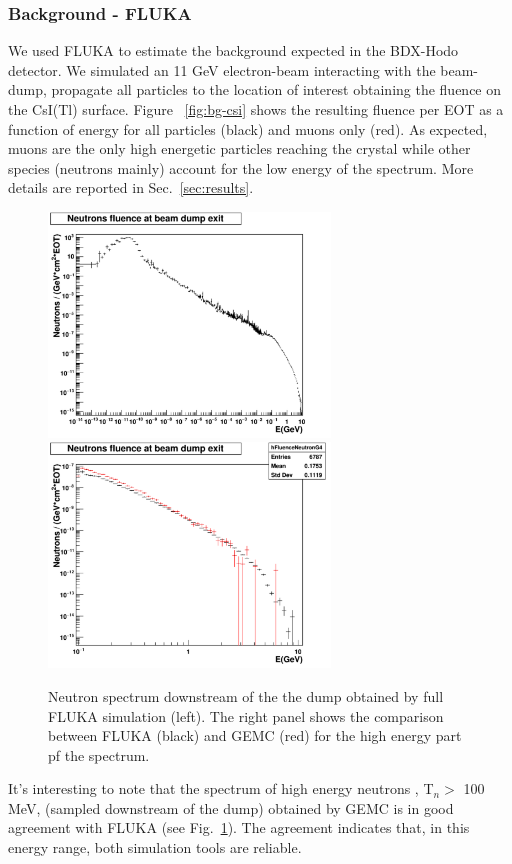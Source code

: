 \subsubsection{Background - FLUKA} 
We used FLUKA to estimate the background expected in the BDX-Hodo detector.
We simulated an 11 GeV electron-beam interacting with the beam-dump, propagate all particles to the location of interest obtaining the fluence on the CsI(Tl) surface.
Figure ~\ref{fig:bg-csi} shows the resulting fluence per EOT as a function of energy  for all particles (black) and muons only (red).
As expected,  muons are the only high energetic  particles reaching  the crystal while other species (neutrons mainly) account for the low energy of the spectrum. More details are reported in Sec.~\ref{sec:results}.
\begin{figure}[h!] 
\center
\includegraphics[width=7.5cm]{figs/NeutronsDump_1D.pdf}    
\includegraphics[width=7.5cm]{figs/NeutronsDumpComparison_1D.pdf}   
\caption{Neutron spectrum downstream of the the dump obtained by full FLUKA simulation (left). The right panel shows  the comparison between FLUKA (black) and GEMC (red) for the high energy part pf the spectrum.}
\label{fig:n-comp}
\end{figure}

It's interesting to note that the spectrum of  high energy neutrons , T$_n>$ 100 MeV,  (sampled downstream of the dump)  obtained by GEMC is in good agreement with FLUKA (see Fig.~\ref{fig:n-comp}). The agreement indicates  that, in this energy range, both simulation tools are reliable. 

